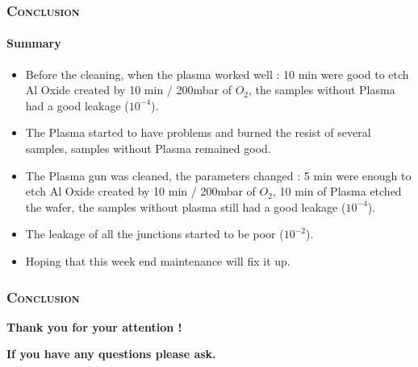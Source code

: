 \documentclass[handout]{beamer}
\begin{document}
    \begin{frame}
           \frametitle{\textsc{Conclusion}}
           \framesubtitle{Summary}
           \begin{itemize}
               \item Before the cleaning, when the plasma worked well : 10 min were good to etch Al Oxide created by 10 min / 200mbar of $O_2$, the samples without Plasma had a good leakage ($10^{-4}$).
               \item The Plasma started to have problems and burned the resist of several samples, samples without Plasma remained good.
               \item The Plasma gun was cleaned, the parameters changed : 5 min were enough to etch Al Oxide created by 10 min / 200mbar of $O_2$, 10 min of Plasma etched the wafer, the samples without plasma still had a good leakage ($10^{-4}$).
               \item The leakage of all the junctions started to be poor ($10^{-2}$).
               \item Hoping that this week end maintenance will fix it up.
           \end{itemize}
           
    \end{frame}
    \begin{frame}
        \frametitle{\textsc{Conclusion}}
        \begin{LARGE}
        
        \centering    
        \textbf{Thank you for your attention !}
        \vspace{0.5cm}
        
        \textbf{If you have any questions please ask.}
        
        \end{LARGE}

       \end{frame}
       
      
    
\end{document}
